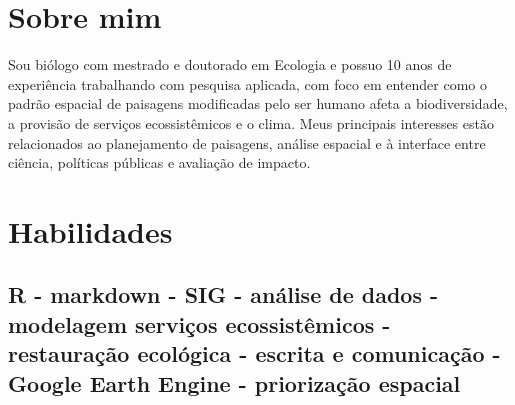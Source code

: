 \documentclass[11pt,a4paper,]{awesome-cv}
\begin{document}
\makecvheader






\hypertarget{sobre-mim}{%
\section{Sobre mim}\label{sobre-mim}}

Sou biólogo com mestrado e doutorado em Ecologia e possuo 10 anos de
experiência trabalhando com pesquisa aplicada, com foco em entender como
o padrão espacial de paisagens modificadas pelo ser humano afeta a
biodiversidade, a provisão de serviços ecossistêmicos e o clima. Meus
principais interesses estão relacionados ao planejamento de paisagens,
análise espacial e à interface entre ciência, políticas públicas e
avaliação de impacto.

\hypertarget{habilidades}{%
\section{Habilidades}\label{habilidades}}

\hypertarget{r---markdown---sig---anuxe1lise-de-dados---modelagem-serviuxe7os-ecossistuxeamicos---restaurauxe7uxe3o-ecoluxf3gica---escrita-e-comunicauxe7uxe3o---google-earth-engine---priorizauxe7uxe3o-espacial}{%
\subsection{R - markdown - SIG - análise de dados - modelagem serviços
ecossistêmicos - restauração ecológica - escrita e comunicação - Google
Earth Engine - priorização
espacial}\label{r---markdown---sig---anuxe1lise-de-dados---modelagem-serviuxe7os-ecossistuxeamicos---restaurauxe7uxe3o-ecoluxf3gica---escrita-e-comunicauxe7uxe3o---google-earth-engine---priorizauxe7uxe3o-espacial}}
\end{document}
